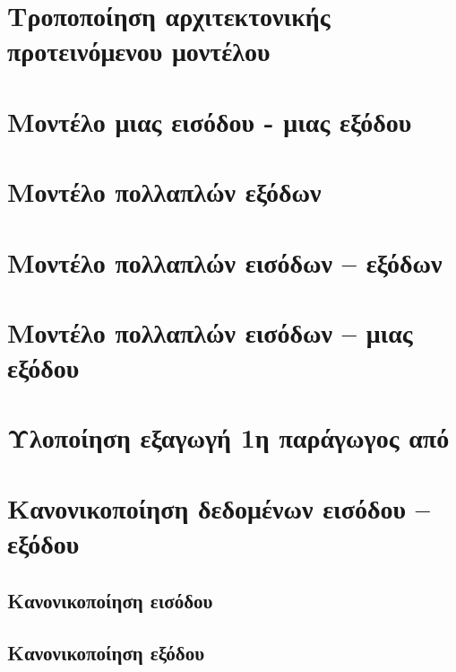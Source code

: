 \section{Τροποποίηση αρχιτεκτονικής προτεινόμενου μοντέλου}

\section{Μοντέλο μιας εισόδου - μιας εξόδου}

\section{Μοντέλο πολλαπλών εξόδων}

\section{Μοντέλο πολλαπλών εισόδων -- εξόδων}

\section{Μοντέλο πολλαπλών εισόδων -- μιας εξόδου}

\section{Υλοποίηση εξαγωγή  1η παράγωγος από }

\section{Κανονικοποίηση δεδομένων εισόδου -- εξόδου}

\subsection{Κανονικοποίηση εισόδου}

\subsection{Κανονικοποίηση εξόδου}
